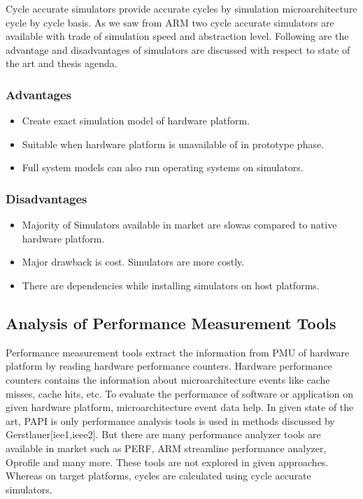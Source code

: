 \par Cycle accurate simulators provide accurate cycles by simulation microarchitecture cycle by cycle basis. As we saw from ARM two cycle accurate simulators are available with trade of simulation speed and abstraction level. Following are the advantage and disadvantages of simulators are discussed with respect to state of the art and thesis agenda.

\subsubsection{Advantages}
\begin{itemize}
   \item Create exact simulation model of hardware platform. 
   \item Suitable when hardware platform is unavailable of in prototype phase.
   \item Full system models can also run operating systems on simulators.
\end{itemize}

\subsubsection{Disadvantages}
\begin{itemize}
   \item Majority of Simulators available in market are slowas compared to native hardware platform.
   \item Major drawback is cost. Simulators are more costly.
   \item There are dependencies while installing simulators on host platforms. 
\end{itemize}

\subsection{Analysis of Performance Measurement Tools}
Performance measurement tools extract the information from PMU of hardware platform by reading hardware performance counters. Hardware performance counters contains the information about microarchitecture events like cache misses, cache hits, etc. To evaluate the performance of software or application on given hardware platform, microarchitecture event data help. In given state of the art, PAPI is only performance analysis tools is used in methods discussed by Gerstlauer[iee1,ieee2]. But there are many performance analyzer tools are available in market such as PERF, ARM streamline performance analyzer, Oprofile and many more. These tools are not explored in given approaches. Whereas on target platforms, cycles are calculated using cycle accurate simulators.

